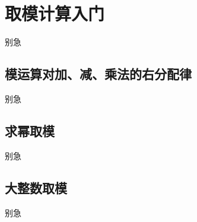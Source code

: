 
\section{取模计算入门}
\begin{frame}{别急}\end{frame} %
\subsection{模运算对加、减、乘法的右分配律}
\begin{frame}[c]
  \progressnow*
\end{frame}
\begin{frame}{别急}\end{frame} %
\subsection{求幂取模}
\begin{frame}[c]
  \progressnow*
\end{frame}
\begin{frame}{别急}\end{frame} %
\subsection{大整数取模}
\begin{frame}[c]
  \progressnow*
\end{frame}
\begin{frame}{别急}\end{frame} %

